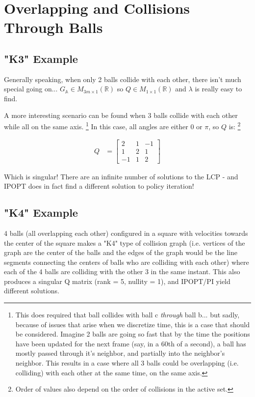 \documentclass[12pt]{article}
\newcommand{\bigA}{{\mathbb{A}}}
\newcommand{\realm}[2]{ M_{#1 \times #2}(\mathbb{R})}
\begin{document}
\section{Overlapping and Collisions Through Balls}

\subsection{"K3" Example}

Generally speaking, when only 2 balls collide with each other, there isn't much
special going on... $G_\bigA \in \realm{3m}{1}$ so $Q \in \realm{1}{1}$ and $\lambda$ is
really easy to find.

A more interesting scenario can be found when 3 balls collide with each other while all on the same axis.
\footnote{
    This does required that ball collides with ball c \textit{through} ball b...
    but sadly, because of issues that arise when we discretize time,
    this is a case that should be considered.
    Imagine 2 balls are going so fast that by the time the positions have been updated for the next frame
    (say, in a 60th of a second), a ball has mostly passed through it's neighbor, and partially into the neighbor's neighbor.
    This results in a case where all 3 balls could be overlapping (i.e. colliding) with each other at the same time, on the same axis.
}
In this case, all angles are either $0$ or $\pi$, so $Q$ is:
\footnote{Order of values also depend on the order of collisions in the active set.}

\begin{align*}
Q
    &= \begin{bmatrix}
        2 & 1 & -1\\
        1 & 2 & 1\\
        -1 & 1 & 2
    \end{bmatrix}
\end{align*}

Which is singular! There are an infinite number of solutions to the LCP
- and IPOPT does in fact find a different solution to policy iteration!

\subsection{"K4" Example}

4 balls (all overlapping each other) configured in a square with velocities
towards the center of the square makes a "K4" type of collision graph
(i.e. vertices of the graph are the center of the balls and the edges of the
graph would be the line segments connecting the centers of balls who are colliding with each other)
where each of the 4 balls are colliding with the other 3 in the same instant.
This also produces a singular Q matrix (rank = 5, nullity = 1), and
IPOPT/PI yield different solutions.
\end{document}
